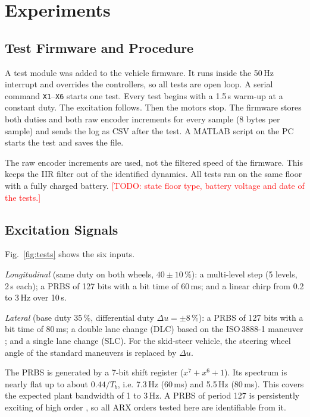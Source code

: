 \documentclass[conference]{IEEEtran}
\newcommand{\todo}[1]{\textcolor{red}{[TODO: #1]}}
\begin{document}
\section{Experiments}
\subsection{Test Firmware and Procedure}
A test module was added to the vehicle firmware. It runs inside the 50\,Hz
interrupt and overrides the controllers, so all tests are open loop. A
serial command \texttt{X1}--\texttt{X6} starts one test. Every test begins
with a 1.5\,s warm-up at a constant duty. The excitation follows. Then the
motors stop. The firmware stores both duties and both raw encoder
increments for every sample (8 bytes per sample) and sends the log as CSV
after the test. A MATLAB script on the PC starts the test and saves the
file.

The raw encoder increments are used, not the filtered speed of the
firmware. This keeps the IIR filter out of the identified dynamics. All
tests ran on the same floor with a fully charged battery.
\todo{state floor type, battery voltage and date of the tests.}

\subsection{Excitation Signals}
Fig.~\ref{fig:tests} shows the six inputs.

\emph{Longitudinal} (same duty on both wheels, $40 \pm 10\,\%$):
a multi-level step (5 levels, 2\,s each);
a PRBS of 127 bits with a bit time of 60\,ms;
and a linear chirp from 0.2 to 3\,Hz over 10\,s.

\emph{Lateral} (base duty 35\,\%, differential duty $\Delta u = \pm 8\,\%$):
a PRBS of 127 bits with a bit time of 80\,ms;
a double lane change (DLC) based on the ISO\,3888-1 maneuver \cite{iso3888};
and a single lane change (SLC).
For the skid-steer vehicle, the steering wheel angle of the standard
maneuvers is replaced by $\Delta u$.

The PRBS is generated by a 7-bit shift register
($x^7 + x^6 + 1$). Its spectrum is nearly flat up to about
$0.44/T_b$, i.e. 7.3\,Hz (60\,ms) and 5.5\,Hz (80\,ms). This covers the
expected plant bandwidth of 1 to 3\,Hz. A PRBS of period 127 is
persistently exciting of high order \cite{ljung}, so all ARX orders tested
here are identifiable from it.
\end{document}

